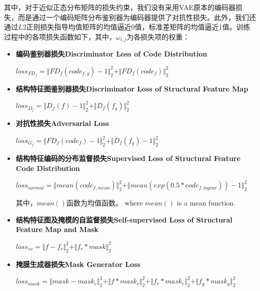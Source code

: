 \documentclass[letterpaper]{article} %
\begin{document}
其中，对于近似正态分布矩阵的损失约束，我们没有采用VAE原本的编码器损失，而是通过一个编码矩阵分布鉴别器为编码器提供了对抗性损失。此外，我们还通过$L2$正则损失指导均值矩阵的均值逼近0值，标准差矩阵的均值逼近1值。训练过程中的各项损失函数如下，其中，$\omega_{i,j}$为各损失项的权重：
\begin{itemize}
	\item \textbf{编码鉴别器损失Discriminator Loss of Code Distribution } 
	\begin{center}
		$loss_{FD_f}=\Vert{FD_f(code_{f,g})-1}\Vert_{2}^{2}+\Vert{FD_f(code_f)}\Vert_{2}^{2}$
	\end{center}
	
	\item \textbf{结构特征图鉴别器损失Discriminator Loss of Structural Feature Map} 
	\begin{center}
		$loss_{D_f}=\Vert{D_f(f)-1}\Vert_{2}^{2}+\Vert{D_f(f_g )}\Vert_{2}^{2}$
	\end{center}
	
	\item \textbf{对抗性损失Adversarial Loss} 
	\begin{center}
		$loss_{G_f}=\Vert{FD_f(code_f)-1}\Vert_{2}^{2}+\Vert{D_f(f_g)-1}\Vert_{2}^{2}$
	\end{center}
	
	\item \textbf{结构特征编码的分布监督损失Supervised Loss of Structural Feature Code Distribution} 
	\begin{center}
		$loss_{normal}=\Vert{mean(code_{f,mean})}\Vert_{2}^{2}+ \Vert{mean(exp(0.5*code_{f,logvar}))-1}\Vert_{2}^{2}$
	\end{center}
	其中，$mean()$函数为均值函数。
	where $mean()$ is a mean function.
	
	\item \textbf{结构特征图及掩模的自监督损失Self-supervised Loss of Structural Feature Map and Mask} 
	\begin{center}
		$loss_{sv}=\Vert{f-f_r}\Vert_{2}^{2}+\Vert{f_r*mask}\Vert_{2}^{2}$
	\end{center}
	
	\item \textbf{掩膜生成器损失Mask Generator Loss}
	\begin{center}
		$loss_{mask}=\Vert{mask-mask_r }\Vert_{2}^{2}+\Vert{f*mask_r}\Vert_{2}^{2}+\Vert{f_r*mask_r}\Vert_{2}^{2}+\Vert{f_g*mask_g}\Vert_{2}^{2}$
	\end{center}
\end{itemize}
\end{document}
